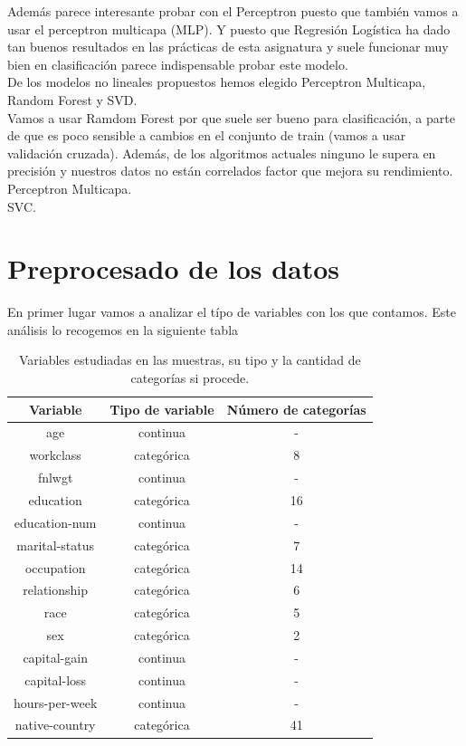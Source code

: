 \documentclass[a4paper,11pt]{article}
\begin{document}
Además parece interesante probar con el Perceptron puesto que también vamos a
usar el perceptron multicapa (MLP). Y puesto que Regresión Logística ha dado tan
buenos resultados en las prácticas de esta asignatura y suele funcionar muy bien
en clasificación parece indispensable probar este modelo.\\

De los modelos no lineales propuestos hemos elegido Perceptron Multicapa, Random Forest y SVD.\\

Vamos a usar Ramdom Forest por que suele ser bueno para clasificación, a parte de que es poco sensible a cambios en el conjunto de train (vamos a usar validación cruzada). Además, de los algoritmos actuales ninguno le supera en precisión y nuestros datos no están correlados factor que mejora su rendimiento.\\

Perceptron Multicapa.\\

SVC.\\

\section{Preprocesado de los datos}

En primer lugar vamos a analizar el típo de variables con los que contamos. Este
análisis lo recogemos en la siguiente tabla

\begin{table}[h!]
    \centering
    \begin{tabular}{|c|c|c|}
    \hline
    Variable & Tipo de variable & Número de categorías\\ \hline
    age & continua & - \\ \hline
    workclass & categórica & 8 \\ \hline
    fnlwgt & continua & - \\ \hline
    education & categórica & 16 \\ \hline
    education-num & continua & - \\ \hline
    marital-status & categórica & 7 \\ \hline
    occupation & categórica & 14 \\ \hline
    relationship & categórica & 6 \\ \hline
    race & categórica & 5 \\ \hline
    sex & categórica & 2 \\ \hline
    capital-gain & continua & - \\ \hline
    capital-loss & continua & - \\ \hline
    hours-per-week & continua & - \\ \hline
    native-country & categórica & 41 \\ \hline
\end{tabular}
\caption{Variables estudiadas en las muestras, su tipo y la cantidad de categorías si procede.}
\end{table}
\end{document}
